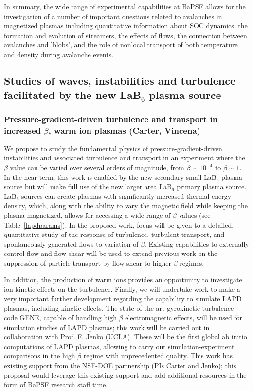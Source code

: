 \documentclass[11pt]{article}
\begin{document}
In summary, the wide range of experimental capabilities at BaPSF allows
for the investigation of a number of important questions related to
avalanches in magnetized plasmas including quantitative information about SOC dynamics, the formation and evolution
of streamers, the effects of flows, the connection between avalanches
and 'blobs', and the role of nonlocal transport of both temperature and
density during avalanche events.


\subsection{Studies of waves, instabilities and turbulence facilitated
  by the new LaB$_6$ plasma source}

\subsubsection{Pressure-gradient-driven turbulence and transport in increased $\beta$, warm ion
  plasmas (Carter, Vincena) } 

We propose to study the fundamental physics of
pressure-gradient-driven instabilities and associated turbulence and
transport in an experiment where the $\beta$ value can be varied over
several orders of magnitude, from $\beta\sim 10^{-4}$ to $\beta\sim
1$. In the near term, this work is enabled by the new secondary small
LaB$_6$ plasma source but will make full use of the new larger area
LaB$_6$ primary plasma source. LaB$_6$ sources can create plasmas with
significantly increased thermal energy density, which, along with the
ability to vary the magnetic field while keeping the plasma
magnetized, allows for accessing a wide range of $\beta$ values (see
Table~\ref{lapdparams}). In the proposed work, focus will be given to
a detailed, quantitative study of the response of turbulence,
turbulent transport, and spontaneously generated flows to variation of
$\beta$. Existing capabilities to externally control flow and flow
shear will be used to extend previous work on the suppression of
particle transport by flow shear to higher $\beta$ regimes.  

In addition, the production of warm ions provides an opportunity to
investigate ion kinetic effects on the turbulence.  Finally, we will
undertake work to make a very important further development regarding
the capability to simulate LAPD plasmas, including kinetic
effects. The state-of-the-art gyrokinetic turbulence code GENE,
capable of handling high $\beta$ electromagnetic effects, will be used
for simulation studies of LAPD plasmas; this work will be carried out
in collaboration with Prof. F. Jenko (UCLA). These will be the first
global ab initio computations of LAPD plasmas, allowing to carry out
simulation-experiment comparisons in the high $\beta$ regime with
unprecedented quality.  This work has existing support from the
NSF-DOE partnership (PIs Carter and Jenko); this proposal would
leverage this existing support and add additional resources in the
form of BaPSF research staff time.
\end{document}
